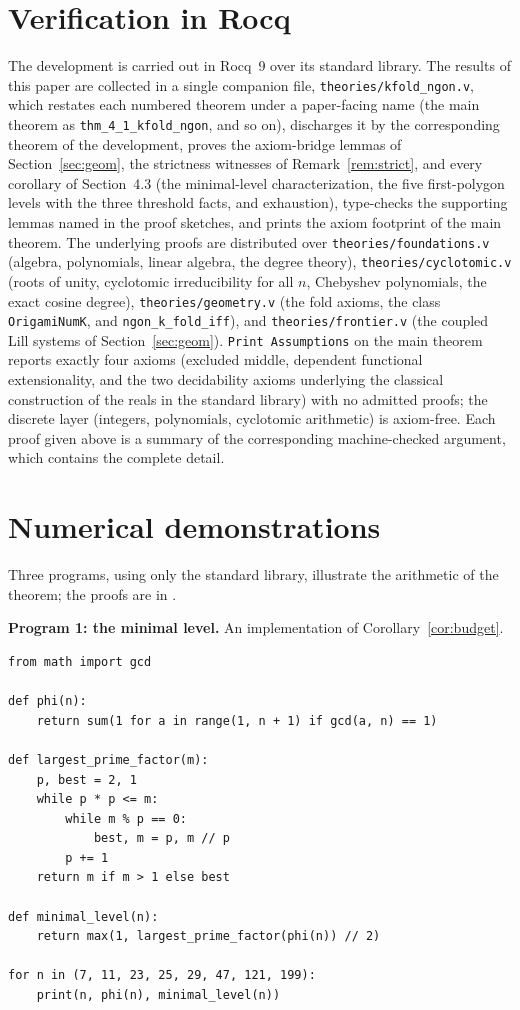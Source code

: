 \documentclass[11pt]{amsart}
\theoremstyle{plain}
\theoremstyle{definition}
\newcommand{\code}[1]{\texttt{#1}}
\begin{document}
\section{Verification in Rocq}

The development \cite{repo} is carried out in Rocq~9 over its standard library. The results of this paper are collected in a single companion file, \code{theories/kfold\_ngon.v}, which restates each numbered theorem under a paper-facing name (the main theorem as \code{thm\_4\_1\_kfold\_ngon}, and so on), discharges it by the corresponding theorem of the development, proves the axiom-bridge lemmas of Section~\ref{sec:geom}, the strictness witnesses of Remark~\ref{rem:strict}, and every corollary of Section~4.3 (the minimal-level characterization, the five first-polygon levels with the three threshold facts, and exhaustion), type-checks the supporting lemmas named in the proof sketches, and prints the axiom footprint of the main theorem. The underlying proofs are distributed over \code{theories/foundations.v} (algebra, polynomials, linear algebra, the degree theory), \code{theories/cyclotomic.v} (roots of unity, cyclotomic irreducibility for all $n$, Chebyshev polynomials, the exact cosine degree), \code{theories/geometry.v} (the fold axioms, the class \code{OrigamiNumK}, and \code{ngon\_k\_fold\_iff}), and \code{theories/frontier.v} (the coupled Lill systems of Section~\ref{sec:geom}). \code{Print Assumptions} on the main theorem reports exactly four axioms (excluded middle, dependent functional extensionality, and the two decidability axioms underlying the classical construction of the reals in the standard library) with no admitted proofs; the discrete layer (integers, polynomials, cyclotomic arithmetic) is axiom-free. Each proof given above is a summary of the corresponding machine-checked argument, which contains the complete detail.

\section{Numerical demonstrations}

Three programs, using only the standard library, illustrate the arithmetic of the theorem; the proofs are in \cite{repo}.

\medskip
\noindent\textbf{Program 1: the minimal level.} An implementation of Corollary~\ref{cor:budget}.

\begin{lstlisting}
from math import gcd

def phi(n):
    return sum(1 for a in range(1, n + 1) if gcd(a, n) == 1)

def largest_prime_factor(m):
    p, best = 2, 1
    while p * p <= m:
        while m % p == 0:
            best, m = p, m // p
        p += 1
    return m if m > 1 else best

def minimal_level(n):
    return max(1, largest_prime_factor(phi(n)) // 2)

for n in (7, 11, 23, 25, 29, 47, 121, 199):
    print(n, phi(n), minimal_level(n))
\end{lstlisting}
\end{document}
